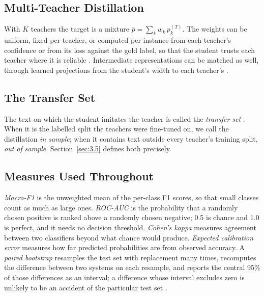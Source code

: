 \subsection{Multi-Teacher Distillation}
With $K$ teachers the target is a mixture $\bar p = \sum_k w_k\, p^{(T)}_k$. The weights can be uniform,
fixed per teacher, or computed per instance from each teacher's confidence or from its loss against the
gold label, so that the student trusts each teacher where it is reliable \cite{you2017learning,
wu2021one, zhang2022confidence}. Intermediate representations can be matched as well, through learned
projections from the student's width to each teacher's \cite{romero2015fitnets, wu2021one}.

\subsection{The Transfer Set}
The text on which the student imitates the teacher is called the \emph{transfer set}
\cite{hinton2015distilling}. When it is the labelled split the teachers were fine-tuned on, we call the
distillation \emph{in sample}; when it contains text outside every teacher's training split,
\emph{out of sample}. Section~\ref{sec:3.5} defines both precisely.

\subsection{Measures Used Throughout}
\emph{Macro-F1} is the unweighted mean of the per-class F1 scores, so that small classes count as much
as large ones. \emph{ROC-AUC} is the probability that a randomly chosen positive is ranked above a
randomly chosen negative; 0.5 is chance and 1.0 is perfect, and it needs no decision threshold.
\emph{Cohen's kappa} measures agreement between two classifiers beyond what chance would produce.
\emph{Expected calibration error} measures how far predicted probabilities are from observed accuracy.
A \emph{paired bootstrap} resamples the test set with replacement many times, recomputes the difference
between two systems on each resample, and reports the central 95\% of those differences as an interval;
a difference whose interval excludes zero is unlikely to be an accident of the particular test set
\cite{koehn2004statistical, dror2018hitchhiker}.

